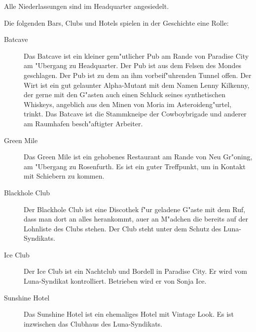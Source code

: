 Alle Niederlassungen sind im Headquarter angesiedelt.


Die folgenden Bars, Clubs und Hotels spielen in der Geschichte eine Rolle:

\begin{description}
    \item [Batcave] Das Batcave ist ein kleiner gem"utlicher Pub am Rande von Paradise City am "Ubergang zu Headquarter. Der Pub ist aus 
        dem Felsen des Mondes geschlagen. Der Pub ist zu dem an ihm vorbeif"uhrenden Tunnel offen. Der Wirt ist ein gut gelaunter Alpha-Mutant mit dem Namen Lenny Kilkenny, der gerne mit den G"asten auch einen Schluck seines synthetischen Whiskeys, angeblich aus den Minen von Moria im Asteroideng"urtel, trinkt. Das Batcave ist die Stammkneipe der Cowboybrigade und anderer am Raumhafen besch"aftigter Arbeiter.
    \item [Green Mile] Das Green Mile ist ein gehobenes Restaurant am Rande von Neu Gr"oning, am "Ubergang zu Rosenfurth.  Es ist ein 
        guter Treffpunkt, um in Kontakt mit Schiebern zu kommen.
    \item [Blackhole Club] Der Blackhole Club ist eine Discothek f"ur geladene G"aste mit dem Ruf, dass man dort an alles herankommt, au\3er 
        an M"adchen die bereits auf der Lohnliste des Clubs stehen. Der Club steht unter dem Schutz des Luna-Syndikats.    
    \item [Ice Club] Der Ice Club ist ein Nachtclub und Bordell in Paradise City. Er wird vom Luna-Syndikat kontrolliert. Betrieben wird 
        er von Sonja Ice.
    \item [Sunshine Hotel] Das Sunshine Hotel ist ein ehemaliges Hotel mit Vintage Look. Es ist inzwischen das Clubhaus des 
        Luna-Syndikats.    
\end{description}
